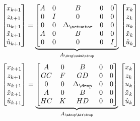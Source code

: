 \begin{equation}
    \begin{bmatrix}
        x_{k+1} \\
        z_{k+1} \\
        u_{k+1} \\
        \hat x_{k+1} \\
        \hat u_{k+1}
    \end{bmatrix} = \underbrace{\begin{bmatrix}
        A & 0 & B & 0 & 0 \\
        0 & I & 0 & 0 & 0 \\
        0 & 0 & \Delta_\actuator & 0 & 0 \\
        A & 0 & B & 0 & 0 \\
        0 & 0 & 0 & 0 & I \\
    \end{bmatrix}}_{A_{\drop\unkn\ndrop}}\, \begin{bmatrix}
        x_{k} \\
        z_{k} \\
        u_{k} \\
        \hat x_{k} \\
        \hat u_{k}
    \end{bmatrix}
\end{equation}
%
\begin{equation}
    \begin{bmatrix}
        x_{k+1} \\
        z_{k+1} \\
        u_{k+1} \\
        \hat x_{k+1} \\
        \hat u_{k+1}
    \end{bmatrix} = \underbrace{\begin{bmatrix}
        A  & 0 & B & 0 & 0 \\
        GC & F & GD & 0 & 0 \\
        0  & 0 & \Delta_\drop & 0 & 0 \\
        A  & 0 & B & 0 & 0 \\
        HC & K & HD & 0 & 0 \\
    \end{bmatrix}}_{A_{\ndrop\hit\drop}}\, \begin{bmatrix}
        x_{k} \\
        z_{k} \\
        u_{k} \\
        \hat x_{k} \\
        \hat u_{k}
    \end{bmatrix}
\end{equation}
